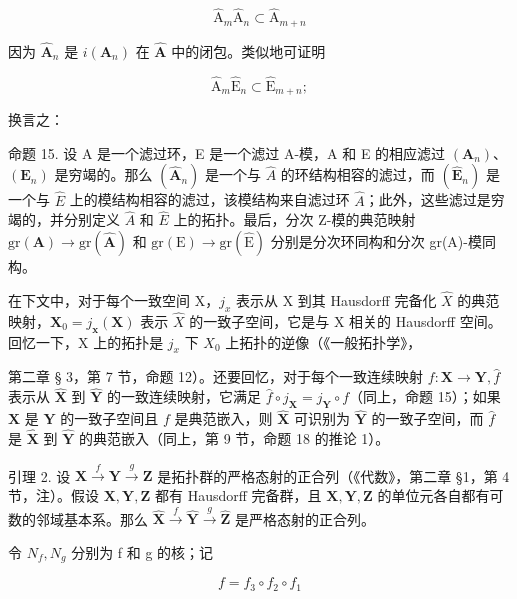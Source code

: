 \[
\hat {\mathrm{A}} _ {m} \hat {\mathrm{A}} _ {n} \subset \hat {\mathrm{A}} _ {m + n}\tag{23}
\]

因为 \(\hat{\mathbf{A}}_n\) 是 \(i(\mathbf{A}_n)\) 在 \(\hat{\mathbf{A}}\) 中的闭包。类似地可证明

\[
\hat {\mathrm{A}} _ {m} \hat {\mathrm{E}} _ {n} \subset \hat {\mathrm{E}} _ {m + n};\tag{24}
\]

换言之：

命题 15. 设 A 是一个滤过环，E 是一个滤过 A-模，A 和 E 的相应滤过 \((\mathbf{A}_{n})\)、\((\mathbf{E}_{n})\) 是穷竭的。那么 \((\hat{\mathbf{A}}_{n})\) 是一个与 \(\hat{A}\) 的环结构相容的滤过，而 \((\hat{\mathbf{E}}_{n})\) 是一个与 \(\hat{E}\) 上的模结构相容的滤过，该模结构来自滤过环 \(\hat{A}\)；此外，这些滤过是穷竭的，并分别定义 \(\hat{A}\) 和 \(\hat{E}\) 上的拓扑。最后，分次 Z-模的典范映射 \(\mathrm{gr}(\mathbf{A}) \to \mathrm{gr}(\hat{\mathbf{A}})\) 和 \(\mathrm{gr}(\mathrm{E}) \to \mathrm{gr}(\hat{\mathrm{E}})\) 分别是分次环同构和分次 gr(A)-模同构。

在下文中，对于每个一致空间 X，\(j_{x}\) 表示从 X 到其 Hausdorff 完备化 \(\hat{X}\) 的典范映射，\(\mathbf{X}_{0}=j_{\mathbf{x}}(\mathbf{X})\) 表示 \(\hat{X}\) 的一致子空间，它是与 X 相关的 Hausdorff 空间。回忆一下，X 上的拓扑是 \(j_{x}\) 下 \(X_{0}\) 上拓扑的逆像（《一般拓扑学》，

第二章 § 3，第 7 节，命题 12）。还要回忆，对于每个一致连续映射 \(f\colon\mathbf{X}\to\mathbf{Y},\hat{f}\) 表示从 \(\hat{\mathbf{X}}\) 到 \(\hat{\mathbf{Y}}\) 的一致连续映射，它满足 \(\hat{f}\circ j_{\mathbf{X}}=j_{\mathbf{Y}}\circ f\)（同上，命题 15）；如果 \(\mathbf{X}\) 是 \(\mathbf{Y}\) 的一致子空间且 \(f\) 是典范嵌入，则 \(\hat{\mathbf{X}}\) 可识别为 \(\hat{\mathbf{Y}}\) 的一致子空间，而 \(\hat{f}\) 是 \(\hat{\mathbf{X}}\) 到 \(\hat{\mathbf{Y}}\) 的典范嵌入（同上，第 9 节，命题 18 的推论 1）。

引理 2. 设 \(\mathbf{X} \xrightarrow{f} \mathbf{Y} \xrightarrow{g} \mathbf{Z}\) 是拓扑群的严格态射的正合列（《代数》，第二章 §1，第 4 节，注）。假设 \(\mathbf{X}, \mathbf{Y}, \mathbf{Z}\) 都有 Hausdorff 完备群，且 \(\mathbf{X}, \mathbf{Y}, \mathbf{Z}\) 的单位元各自都有可数的邻域基本系。那么 \(\hat{\mathbf{X}} \xrightarrow{f} \hat{\mathbf{Y}} \xrightarrow{g} \hat{\mathbf{Z}}\) 是严格态射的正合列。

令 \(N_{f}, N_{g}\) 分别为 f 和 g 的核；记

\[
f = f _ {3} \circ f _ {2} \circ f _ {1}
\]

